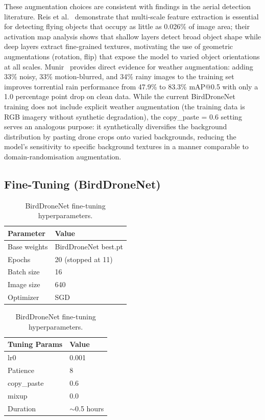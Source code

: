 \documentclass[12pt,a4paper]{report}
\renewcommand{\arraystretch}{1.1}
\begin{document}
These augmentation choices are consistent with findings in the aerial
detection literature. Reis et al.~\cite{reis2024yolov8} demonstrate that
multi-scale feature extraction is essential for detecting flying objects
that occupy as little as 0.026\% of image area; their activation map
analysis shows that shallow layers detect broad object shape while deep
layers extract fine-grained textures, motivating the use of geometric
augmentations (rotation, flip) that expose the model to varied object
orientations at all scales. Munir~\cite{munir2023kfupm} provides direct
evidence for weather augmentation: adding 33\% noisy, 33\% motion-blurred,
and 34\% rainy images to the training set improves torrential rain
performance from 47.9\% to 83.3\% mAP@0.5 with only a 1.0 percentage
point drop on clean data. While the current BirdDroneNet training does
not include explicit weather augmentation (the training data is RGB
imagery without synthetic degradation), the copy\_paste = 0.6 setting
serves an analogous purpose: it synthetically diversifies the background
distribution by pasting drone crops onto varied backgrounds, reducing
the model's sensitivity to specific background textures in a manner
comparable to domain-randomisation augmentation.

\subsection{Fine-Tuning (BirdDroneNet)}

\begin{table}[H]
\centering
\caption[Fine-tuning hyperparameters]{BirdDroneNet fine-tuning hyperparameters.}
\begin{minipage}[t]{0.48\textwidth}
\centering
\renewcommand{\arraystretch}{0.9}
\begin{tabular}{|l|l|}
\hline
\rowcolor{gray!20}
\textbf{Parameter} & \textbf{Value} \\
\hline
Base weights & BirdDroneNet best.pt \\
\hline
Epochs       & 20 (stopped at 11) \\
\hline
Batch size   & 16 \\
\hline
Image size   & 640 \\
\hline
Optimizer    & SGD \\
\hline
\end{tabular}
\end{minipage}
\hfill
\begin{minipage}[t]{0.48\textwidth}
\centering
\renewcommand{\arraystretch}{0.9}
\begin{tabular}{|l|l|}
\hline
\rowcolor{gray!20}
\textbf{Tuning Params} & \textbf{Value} \\
\hline
lr0          & 0.001 \\
\hline
Patience     & 8 \\
\hline
copy\_paste  & 0.6 \\
\hline
mixup        & 0.0 \\
\hline
Duration     & $\sim$0.5 hours \\
\hline
\end{tabular}
\end{minipage}
\end{table}
\end{document}
